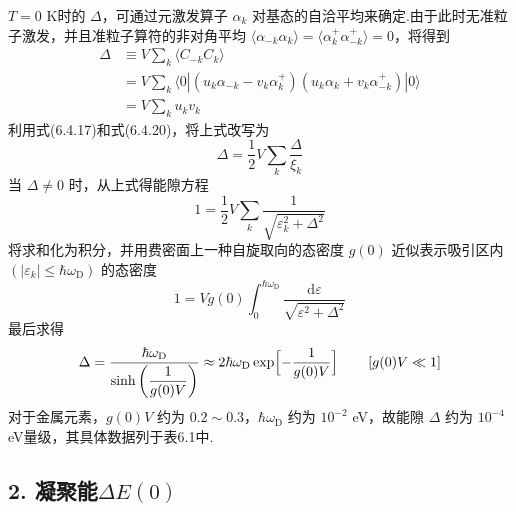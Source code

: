 $T=0$ K时的 $\Delta$，可通过元激发算子 $\alpha_{k}$ 对基态的自洽平均来确定.由于此时无准粒子激发，并且准粒子算符的非对角平均 $\langle\alpha_{-k}\alpha_{k}\rangle=\langle\alpha^{+}_{k}\alpha^{+}_{-k}\rangle=0$，将得到
\begin{equation}
\begin{aligned}
  \Delta&\equiv V\sum_{k}\langle C_{-k}C_{k}\rangle\\
  &=V\sum_{k}\langle0|\left(u_{k}\alpha_{-k}-v_{k}\alpha^{+}_{k}\right)
  \left(u_{k}\alpha_{k}+v_{k}\alpha^{+}_{-k}\right)|0\rangle\\
  &=V\sum_{k}u_{k}v_{k}
\end{aligned}
\end{equation}
利用式(6.4.17)和式(6.4.20)，将上式改写为
\begin{equation}
  \Delta=\frac{1}{2}V\sum_{k}\frac{\Delta}{\xi_{k}}
\end{equation}
当 $\Delta\neq0$ 时，从上式得能隙方程
\begin{equation}
  1=\frac{1}{2}V\sum_{k}\frac{1}{\sqrt{\varepsilon_{k}^{2}+\Delta^{2}}}
\end{equation}
将求和化为积分，并用费密面上一种自旋取向的态密度 $g(0)$ 近似表示吸引区内 $\left(|\varepsilon_{k}|\leqslant\hbar\omega_{\mathrm{D}}\right)$ 的态密度
\begin{equation}
  1=Vg(0)\int_{0}^{\hbar\omega_{\mathrm{D}}}
  \frac{\mathrm{d}\varepsilon}{\sqrt{\varepsilon^{2}+\Delta^{2}}}
\end{equation}
最后求得
\begin{equation}
  \Delta=\frac{\hbar\omega_{\mathrm{D}}}{\sinh\left(\dfrac{1}{g(0)V}\right)}
  \approx 2\hbar\omega_{\mathrm{D}}\exp\Bigl[-\frac{1}{g(0)V}\Bigr]
  \qquad\left[g(0)V\ll1\right]
\end{equation}
对于金属元素，$g(0)V$ 约为 $0.2\sim0.3$，$\hbar\omega_{\mathrm{D}}$ 约为 $10^{-2}$ eV，故能隙 $\Delta$ 约为 $10^{-4}$ eV量级，其具体数据列于表6.1中.

\subsection*{2. 凝聚能$\Delta E(0)$}

